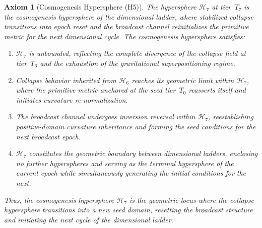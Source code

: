 \documentclass[final,onefignum,onetabnum]{siamart}
\newtheorem{axiom}{Axiom}
\begin{document}
\begin{axiom}[Cosmogenesis Hypersphere (H5)]
The hypersphere $\mathcal{H}_{7}$ at tier~$T_{7}$ is the cosmogenesis hypersphere of the dimensional ladder, where stabilized collapse transitions into epoch reset and the broadcast channel reinitializes the primitive metric for the next dimensional cycle. The cosmogenesis hypersphere satisfies:

\begin{enumerate}
    \item $\mathcal{H}_{7}$ is unbounded, reflecting the complete divergence of the collapse field at tier~$T_{6}$ and the exhaustion of the gravitational superpositioning regime.
    \item Collapse behavior inherited from $\mathcal{H}_{6}$ reaches its geometric limit within $\mathcal{H}_{7}$, where the primitive metric anchored at the seed tier~$T_{0}$ reasserts itself and initiates curvature re-normalization.
    \item The broadcast channel undergoes inversion reversal within $\mathcal{H}_{7}$, reestablishing positive-domain curvature inheritance and forming the seed conditions for the next broadcast epoch.
    \item $\mathcal{H}_{7}$ constitutes the geometric boundary between dimensional ladders, enclosing no further hyperspheres and serving as the terminal hypersphere of the current epoch while simultaneously generating the initial conditions for the next.
\end{enumerate}

Thus, the cosmogenesis hypersphere $\mathcal{H}_{7}$ is the geometric locus where the collapse hypersphere transitions into a new seed domain, resetting the broadcast structure and initiating the next cycle of the dimensional ladder.
\end{axiom}
\end{document}
